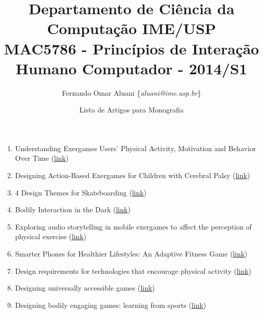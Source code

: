 \documentclass[a4paper,11pt]{article}
\newcommand{\sepitem}{\vspace{0.1in}\item}
\begin{document}
\small{
\title{
{\small 
Departamento de Ciência da Computação \hfill IME/USP}\\\vspace{0.1in}
MAC5786 - Princípios de Interação Humano Computador - 2014/S1
}
\vspace{-0.6in} 
\author{Fernando Omar Aluani  \{\textit{aluani@ime.usp.br}\}
\vspace{-0.6in} 
}
\date{Lista de Artigos para Monografia}
\maketitle
}
\vspace {-0.3in}
\thispagestyle{empty}

\begin{enumerate}
  \sepitem Understanding Exergames Users' Physical Activity, Motivation and Behavior Over Time (\href{http://dl.acm.org/citation.cfm?id=2470654.2466163&coll=DL&dl=GUIDE&CFID=425338272&CFTOKEN=89111191}{link})
  
  \sepitem Designing Action-Based Exergames for Children with Cerebral Palsy (\href{http://dl.acm.org/citation.cfm?id=2470654.2466164&coll=DL&dl=GUIDE&CFID=425338272&CFTOKEN=89111191}{link})
  
  \sepitem 4 Design Themes for Skateboarding (\href{http://dl.acm.org/citation.cfm?id=2470654.2466165&coll=DL&dl=GUIDE&CFID=425338272&CFTOKEN=89111191}{link})
  
  \sepitem Bodily Interaction in the Dark (\href{http://dl.acm.org/citation.cfm?id=2470654.2466166&coll=DL&dl=GUIDE&CFID=425338272&CFTOKEN=89111191}{link})
  
  \sepitem Exploring audio storytelling in mobile exergames to affect the perception of physical exercise (\href{http://dl.acm.org/citation.cfm?id=2534504.2534506&coll=DL&dl=GUIDE&CFID=425338272&CFTOKEN=89111191}{link})
  
  \sepitem Smarter Phones for Healthier Lifestyles: An Adaptive Fitness Game (\href{http://dl.acm.org/citation.cfm?id=1907784&CFID=425338272&CFTOKEN=89111191}{link})
  
  \sepitem Design requirements for technologies that encourage physical activity (\href{http://dl.acm.org/citation.cfm?id=1124840&CFID=425338272&CFTOKEN=89111191}{link})
  
  \sepitem Designing universally accessible games (\href{http://dl.acm.org/citation.cfm?id=1486516&CFID=425338272&CFTOKEN=89111191}{link})
  
  \sepitem Designing bodily engaging games: learning from sports (\href{http://dl.acm.org/citation.cfm?id=2000756.2000768&coll=DL&dl=GUIDE&CFID=425338272&CFTOKEN=89111191}{link})
  

\end{enumerate}
\end{document}
